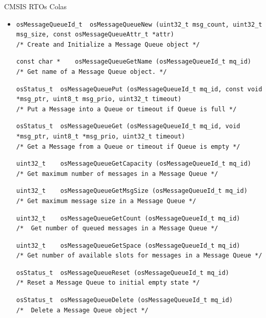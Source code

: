\begin{frame}[fragile]{CMSIS RTOs Colas}
    \begin{itemize}
        \item []
         \begin{verbatim}
osMessageQueueId_t 	osMessageQueueNew (uint32_t msg_count, uint32_t msg_size, const osMessageQueueAttr_t *attr)
/* Create and Initialize a Message Queue object */
         \end{verbatim}
         \begin{verbatim}
const char * 	osMessageQueueGetName (osMessageQueueId_t mq_id)
/* Get name of a Message Queue object. */
         \end{verbatim}
         \begin{verbatim}
osStatus_t 	osMessageQueuePut (osMessageQueueId_t mq_id, const void *msg_ptr, uint8_t msg_prio, uint32_t timeout)
/* Put a Message into a Queue or timeout if Queue is full */
         \end{verbatim}
         \begin{verbatim}
osStatus_t 	osMessageQueueGet (osMessageQueueId_t mq_id, void *msg_ptr, uint8_t *msg_prio, uint32_t timeout)
/* Get a Message from a Queue or timeout if Queue is empty */
         \end{verbatim}   
         \begin{verbatim}
uint32_t 	osMessageQueueGetCapacity (osMessageQueueId_t mq_id)
/* Get maximum number of messages in a Message Queue */
         \end{verbatim}            
         \begin{verbatim}
uint32_t 	osMessageQueueGetMsgSize (osMessageQueueId_t mq_id)
/* Get maximum message size in a Message Queue */
         \end{verbatim}
         \begin{verbatim}
uint32_t 	osMessageQueueGetCount (osMessageQueueId_t mq_id)
/* 	Get number of queued messages in a Message Queue */
         \end{verbatim}
         \begin{verbatim}
uint32_t 	osMessageQueueGetSpace (osMessageQueueId_t mq_id)
/* Get number of available slots for messages in a Message Queue */
         \end{verbatim}
         \begin{verbatim}
osStatus_t 	osMessageQueueReset (osMessageQueueId_t mq_id)
/* Reset a Message Queue to initial empty state */
         \end{verbatim}
         \begin{verbatim}
osStatus_t 	osMessageQueueDelete (osMessageQueueId_t mq_id)
/* 	Delete a Message Queue object */
         \end{verbatim}
                  

\end{itemize}
\end{frame}
